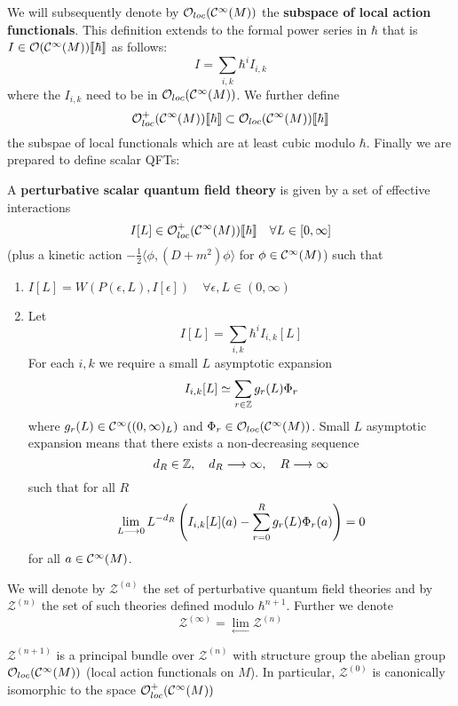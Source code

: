 We will subsequently denote by $\mathcal{O}_{loc}(\mathcal{C}^{\infty}(M))$ the \textbf{subspace of local action functionals}. This definition extends to the formal power series in $\hbar$ that is $I \in \mathcal{O}(\mathcal{C}^{\infty}(M))\llbracket \hbar \rrbracket$ as follows:
$$ I = \sum_{i,k} \hbar^i I_{i,k} $$
where the $I_{i,k}$ need to be in $\mathcal{O}_{loc}(\mathcal{C}^{\infty}(M))$. We further define
$$ \mathcal{O}^+_{loc}(\mathcal{C}^{\infty}(M))\llbracket \hbar \rrbracket \subset \mathcal{O}_{loc}(\mathcal{C}^{\infty}(M))\llbracket \hbar \rrbracket $$
the subspae of local functionals which are at least cubic modulo $\hbar$. Finally we are prepared to define scalar QFTs:

\begin{definition}
\label{def:PSQFTs}
  A \textbf{perturbative scalar quantum field theory} is given by a set of effective interactions
  $$ I[L] \in \mathcal{O}^+_{loc}(\mathcal{C}^{\infty}(M))\llbracket \hbar \rrbracket \quad \forall L \in [0, \infty] $$
  (plus a kinetic action $- \frac{1}{2} \langle \phi, (D + m^2) \phi \rangle$ for $\phi \in \Ci(M)$) such that
  \begin{enumerate}
    \item $I[L] = W(P(\epsilon, L), I[\epsilon]) \quad \forall \epsilon,L \in (0,\infty)$

    \item Let
    $$ I[L] = \sum_{i,k} \hbar^i I_{i,k}[L] $$
    For each $i,k$ we require a small $L$ asymptotic expansion
    $$ I_{i,k}[L] \simeq \sum_{r \in \mathbb{Z}} g_r(L) \Phi_r $$
    where $g_r(L) \in \mathcal{C}^{\infty}((0,\infty)_L)$ and $\Phi_r \in \mathcal{O}_{loc}(\mathcal{C}^{\infty}(M))$. Small $L$ asymptotic expansion means that there exists a non-decreasing sequence
    $$ d_R \in \mathbb{Z}, \quad d_R \longrightarrow \infty, \quad R\longrightarrow \infty $$
    such that for all $R$
    $$ \lim_{L \longrightarrow 0} L^{-d_R} \left( I_{i,k}[L](a) - \sum_{r=0}^R g_r(L) \Phi_r(a) \right) = 0 $$
    for all $a \in \mathcal{C}^{\infty}(M)$.
  \end{enumerate}
  We will denote by $\mathcal{Z}^{(a)}$ the set of perturbative quantum field theories and by $\mathcal{Z}^{(n)}$ the set of such theories defined modulo $\hbar^{n+1}$. Further we denote
  $$ \mathcal{Z}^{(\infty)} = \lim_{\longleftarrow} \mathcal{Z}^{(n)} $$
\end{definition}

\begin{theo}
  $\mathcal{Z}^{(n+1)}$ is a principal bundle over $\mathcal{Z}^{(n)}$ with structure group the abelian group $\mathcal{O}_{loc}(\mathcal{C}^{\infty}(M))$ (local action functionals on $M$). In particular, $\mathcal{Z}^{(0)}$ is canonically isomorphic to the space $\mathcal{O}^+_{loc}(\mathcal{C}^{\infty}(M))$
\end{theo}

